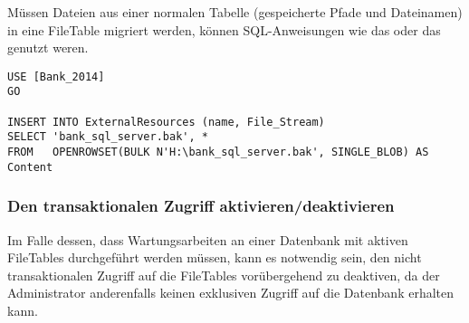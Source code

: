           Müssen Dateien aus einer normalen Tabelle (gespeicherte Pfade und
          Dateinamen) in eine FileTable migriert werden, können SQL-Anweisungen
          wie das  oder das  genutzt weren.
           \begin{lstlisting}[language=ms_sql, caption={Mit TSQL eine Datei in
           eine FileTable einfügen}, label=admin04_05b]
USE [Bank_2014]
GO

INSERT INTO ExternalResources (name, File_Stream)
SELECT 'bank_sql_server.bak', *
FROM   OPENROWSET(BULK N'H:\bank_sql_server.bak', SINGLE_BLOB) AS Content
          \end{lstlisting}
          \begin{literaturinternet}
            \item \cite{sqlarticlesagwwf}
          \end{literaturinternet}
        \subsubsection{Den transaktionalen Zugriff aktivieren/deaktivieren}
          Im Falle dessen, dass Wartungsarbeiten an einer Datenbank mit aktiven
          FileTables durchgeführt werden müssen, kann es notwendig sein, den
          nicht transaktionalen Zugriff auf die FileTables vorübergehend zu
          deaktiven, da der Administrator anderenfalls keinen exklusiven Zugriff
          auf die Datenbank erhalten kann.
          
